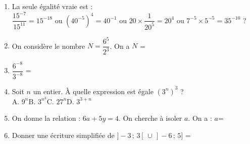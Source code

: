 \documentclass[a4paper,11pt]{article}
\begin{document}
\begin{seance}{} %

\begin{enumerate}
\item La seule égalité vraie est : \\
$\dfrac{15^{-7}}{15^{11}}=15^{-18}$ ou $\left(40^{-5}\right)^4=40^{-1}$ ou $20\times \dfrac{1}{20^{5}}=20^{4}$ ou $7^{-5}\times 5^{-5}=35^{-10}$ ?

\item On considère le nombre $N=\dfrac{6^5}{2^3}$. On a $N$ = \dotfill

\item $\dfrac{6^{-8}}{3^{-8}}$ = \dotfill

\item Soit $n$ un entier. À quelle expression est égale $(3^{n})^{3}$ ? \\
A. $9^{n}$\qquad B. $3^{n^{3}}$\qquad C. $27^{n}$\qquad D. $3^{3+n}$\qquad 
\dotfill

\item On donne la relation  : $6a+5y=4$. On cherche à isoler $a$. On a :  $a$= \dotfill 


\item Donner une écriture simplifiée de $]-3\,;\,3[\,\cup \,] -6\,;\,5]$ = \dotfill



\end{enumerate}

\end{seance}
\end{document}
